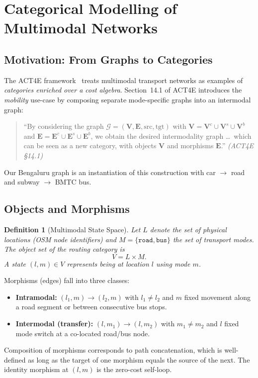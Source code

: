 \documentclass[12pt,a4paper]{article}
\newtheorem{definition}{Definition}[section]
\begin{document}
\section{Categorical Modelling of Multimodal Networks}
\label{sec:category}

\subsection{Motivation: From Graphs to Categories}

The ACT4E framework~\cite{act4e} treats multimodal transport networks as
examples of \emph{categories enriched over a cost algebra}.  Section~14.1
of ACT4E introduces the \emph{mobility} use-case by composing separate
mode-specific graphs into an intermodal graph:

\begin{quote}
  ``By considering the graph $\mathcal{G} = (\mathbf{V}, \mathbf{E},
  \mathrm{src}, \mathrm{tgt})$ with $\mathbf{V} = \mathbf{V}^c \cup
  \mathbf{V}^s \cup \mathbf{V}^b$ and $\mathbf{E} = \mathbf{E}^c \cup
  \mathbf{E}^s \cup \mathbf{E}^b$, we obtain the desired intermodality
  graph \ldots\ which can be seen as a new category, with objects
  $\mathbf{V}$ and morphisms $\mathbf{E}$.'' \emph{(ACT4E §14.1)}
\end{quote}

Our Bengaluru graph is an instantiation of this construction with car
$\to$ road and subway $\to$ BMTC bus.

\subsection{Objects and Morphisms}

\begin{definition}[Multimodal State Space]
  Let $L$ denote the set of physical locations (OSM node identifiers) and
  $M = \{\texttt{road}, \texttt{bus}\}$ the set of transport modes.  The
  \emph{object set} of the routing category is
  \[
    V = L \times M.
  \]
  A state $(l, m) \in V$ represents being at location $l$ using mode $m$.
\end{definition}

Morphisms (edges) fall into three classes:
\begin{itemize}[noitemsep]
  \item \textbf{Intramodal:} $(l_1, m) \to (l_2, m)$ with $l_1 \neq l_2$
        and $m$ fixed  movement along a road segment or between consecutive
        bus stops.
  \item \textbf{Intermodal (transfer):} $(l, m_1) \to (l, m_2)$ with
        $m_1 \neq m_2$ and $l$ fixed  mode switch at a co-located
        road/bus node.
\end{itemize}
Composition of morphisms corresponds to path concatenation, which is
well-defined as long as the target of one morphism equals the source of the
next.  The identity morphism at $(l, m)$ is the zero-cost self-loop.
\end{document}
